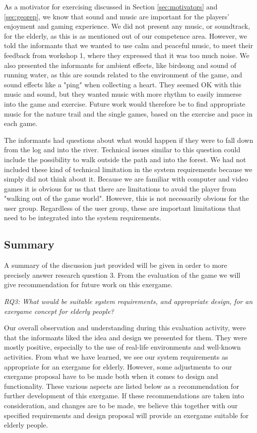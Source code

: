 As a motivator for exercising discussed in Section \ref{sec:motivators} and \ref{sec:georep}, we know that sound and music are important for the players' enjoyment and gaming experience. We did not present any music, or soundtrack, for the elderly, as this is as mentioned out of our competence area. However, we told the informants that we wanted to use calm and peaceful music, to meet their feedback from workshop 1, where they expressed that it was too much noise. We also presented the informants for ambient effects, like birdsong and sound of running water, as this are sounds related to the environment of the game, and sound effects like a "ping" when collecting a heart. They seemed OK with this music and sound, but they wanted music with more rhythm to easily immerse into the game and exercise. Future work would therefore be to find appropriate music for the nature trail and the single games, based on the exercise and pace in each game. 

The informants had questions about what would happen if they were to fall down from the log and into the river. Technical issues similar to this question could include the possibility to walk outside the path and into the forest. We had not included these kind of technical limitation in the system requirements because we simply did not think about it. Because we are familiar with computer and video games it is obvious for us that there are limitations to avoid the player from "walking out of the game world". However, this is not necessarily obvious for the user group. Regardless of the user group, these are important limitations that need to be integrated into the system requirements. 

\subsection{Summary}
\label{sec:summarydiscW2}
A summary of the discussion just provided will be given in order to more precisely answer research question 3. From the evaluation of the game we will give recommendation for future work on this exergame. 

\emph{RQ3: What would be suitable system requirements, and appropriate design, for an exergame concept for elderly people?}

Our overall observation and understanding during this evaluation activity, were that the informants liked the idea and design we presented for them. They were mostly positive, especially to the use of real-life environments and well-known activities. From what we have learned, we see our system requirements as appropriate for an exergame for elderly. However, some adjustments to our exergame proposal have to be made both when it comes to design and functionality. These various aspects are listed below as a recommendation for further development of this exergame. If these recommendations are taken into consideration, and changes are to be made, we believe this together with our specified requirements and design proposal will provide an exergame suitable for elderly people.  

